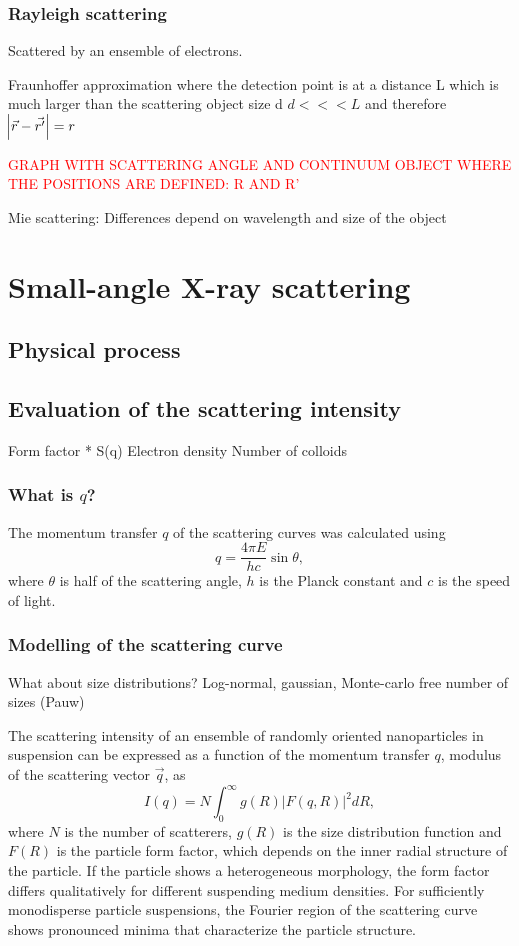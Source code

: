 \subsubsection{Rayleigh scattering}
Scattered by an ensemble of electrons.

Fraunhoffer approximation where the detection point is at a distance L which is much larger than the scattering object size d $d<<<L$ and therefore $\abs{\vec{r}-\vec{r'}}=r$

\textcolor{red}{GRAPH WITH SCATTERING ANGLE AND CONTINUUM OBJECT WHERE THE POSITIONS ARE DEFINED: R AND R'}

Mie scattering: Differences depend on wavelength and size of the object

\section{Small-angle X-ray scattering}
\subsection{Physical process}
\subsection{Evaluation of the scattering intensity}
Form factor * S(q)
Electron density
Number of colloids
\subsubsection{What is $q$?}
The momentum transfer \(q\) of the scattering curves was calculated using
\begin{equation}
q=\frac{4\pi E}{hc}\sin\theta ,
\end{equation}
where \(\theta\) is half of the scattering angle, \(h\) is the Planck constant and \(c\) is the speed of light.

\subsubsection{Modelling of the scattering curve}
What about size distributions? Log-normal, gaussian, Monte-carlo free number of sizes (Pauw)

The scattering intensity of an ensemble of randomly oriented nanoparticles in suspension can be expressed as a function of the momentum transfer \( q \), modulus of the scattering vector \(\vec q\), as
\begin{equation}
\label{eq:intensity}
I(q)=N\int_{0}^{\infty} g(R)\left|F(q,R) \right|^2 dR,
\end{equation}
where \(N\) is the number of scatterers, \(g(R)\) is the size distribution function and \(F(R)\) is the particle form factor, which depends on the inner radial structure of the particle. If the particle shows a heterogeneous morphology, the form factor differs qualitatively for different suspending medium densities.  For sufficiently monodisperse particle suspensions, the Fourier region of the scattering curve shows pronounced minima that characterize the particle structure. 

